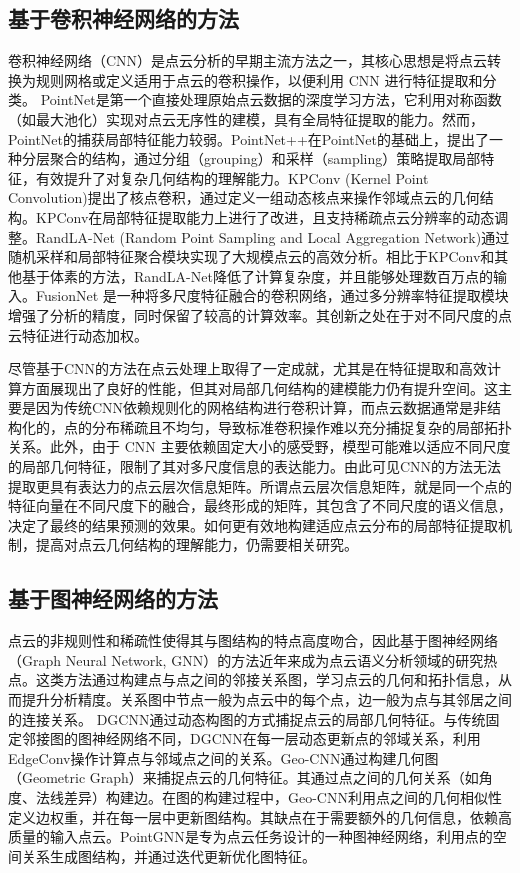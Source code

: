 \documentclass[preprint,12pt]{elsarticle}
\begin{document}
\subsection{基于卷积神经网络的方法}
卷积神经网络（CNN）是点云分析的早期主流方法之一，其核心思想是将点云转换为规则网格或定义适用于点云的卷积操作，以便利用 CNN 进行特征提取和分类。
PointNet\cite{pointnet}是第一个直接处理原始点云数据的深度学习方法，它利用对称函数（如最大池化）实现对点云无序性的建模，具有全局特征提取的能力。然而，PointNet的捕获局部特征能力较弱。PointNet++\cite{PointNet++}在PointNet的基础上，提出了一种分层聚合的结构，通过分组（grouping）和采样（sampling）策略提取局部特征，有效提升了对复杂几何结构的理解能力。KPConv\cite{KPConv} (Kernel Point Convolution)提出了核点卷积，通过定义一组动态核点来操作邻域点云的几何结构。KPConv在局部特征提取能力上进行了改进，且支持稀疏点云分辨率的动态调整。RandLA-Net\cite{Randla} (Random Point Sampling and Local Aggregation Network)通过随机采样和局部特征聚合模块实现了大规模点云的高效分析。相比于KPConv和其他基于体素的方法，RandLA-Net降低了计算复杂度，并且能够处理数百万点的输入。FusionNet\cite{FusionNet} 是一种将多尺度特征融合的卷积网络，通过多分辨率特征提取模块增强了分析的精度，同时保留了较高的计算效率。其创新之处在于对不同尺度的点云特征进行动态加权。

尽管基于CNN的方法在点云处理上取得了一定成就，尤其是在特征提取和高效计算方面展现出了良好的性能，但其对局部几何结构的建模能力仍有提升空间。这主要是因为传统CNN依赖规则化的网格结构进行卷积计算，而点云数据通常是非结构化的，点的分布稀疏且不均匀，导致标准卷积操作难以充分捕捉复杂的局部拓扑关系。此外，由于 CNN 主要依赖固定大小的感受野，模型可能难以适应不同尺度的局部几何特征，限制了其对多尺度信息的表达能力。由此可见CNN的方法无法提取更具有表达力的点云层次信息矩阵。所谓点云层次信息矩阵，就是同一个点的特征向量在不同尺度下的融合，最终形成的矩阵，其包含了不同尺度的语义信息，决定了最终的结果预测的效果。如何更有效地构建适应点云分布的局部特征提取机制，提高对点云几何结构的理解能力，仍需要相关研究。

\subsection{基于图神经网络的方法}
点云的非规则性和稀疏性使得其与图结构的特点高度吻合，因此基于图神经网络（Graph Neural Network, GNN）的方法近年来成为点云语义分析领域的研究热点。这类方法通过构建点与点之间的邻接关系图，学习点云的几何和拓扑信息，从而提升分析精度。关系图中节点一般为点云中的每个点，边一般为点与其邻居之间的连接关系。
DGCNN\cite{DGCNN}通过动态构图的方式捕捉点云的局部几何特征。与传统固定邻接图的图神经网络不同，DGCNN在每一层动态更新点的邻域关系，利用EdgeConv操作计算点与邻域点之间的关系。Geo-CNN\cite{geo-cnn}通过构建几何图（Geometric Graph）来捕捉点云的几何特征。其通过点之间的几何关系（如角度、法线差异）构建边。在图的构建过程中，Geo-CNN利用点之间的几何相似性定义边权重，并在每一层中更新图结构。其缺点在于需要额外的几何信息，依赖高质量的输入点云。PointGNN\cite{Point-GNN}是专为点云任务设计的一种图神经网络，利用点的空间关系生成图结构，并通过迭代更新优化图特征。
\end{document}
